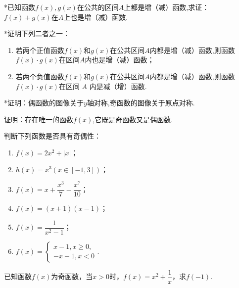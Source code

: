\documentclass[lang=cn,math=cm,chinesefont=nofont,11pt,scheme=chinese,twocol]{elegantbook}
\begin{document}
\begin{exercise}
  *已知函数$f(x),g(x)$在公共的区间$A$上都是增（减）函数,求证：$f(x)+g(x)$在$A$上也是增（减）函数.
\end{exercise}

\begin{exercise}
  *证明下列二者之一：
\end{exercise}

\begin{enumerate}
  \item 若两个正值函数$f(x)$和$g(x)$在公共区间$A$内都是增（减）函数,则函数$f(x)\cdot g(x)$在区间$A$内也是增（减）函数；
  \item 若两个负值函数$f(x)$和$g(x)$在公共区间$A$内都是增（减）函数,则函数$f(x)\cdot g(x)$在区间 $A$ 内是减（增）函数.
\end{enumerate}

\begin{exercise}
  *证明：偶函数的图像关于$y$轴对称,奇函数的图像关于原点对称.
\end{exercise}

\begin{spacing}{1.8}
  \begin{exercise}
    证明：存在唯一的函数$f(x)$,它既是奇函数又是偶函数.
  \end{exercise}

  \begin{exercise}
    判断下列函数是否具有奇偶性：
  \end{exercise}

  \begin{enumerate}
    \item $f(x)=2x^2+|x|$；
    \item $h(x)=x^3(x\in[-1,3])$；
    \item $f(x)=x+\dfrac{x^3}7-\dfrac{x^7}{10}$；
    \item $f(x)=(x+1)(x-1)$；
    \item $f(x)=\dfrac{1}{x^{2}-1}$；
    \item $f(x)=\begin{cases}x-1, x\geqslant0,\\-x-1, x<0\end{cases}$.
  \end{enumerate}
\end{spacing}

\begin{exercise}
  已知函数$f(x)$为奇函数，当$x>0$时，$f(x)=x^2+\dfrac1x$，求$f(-1)$.
\end{exercise}
\end{document}
